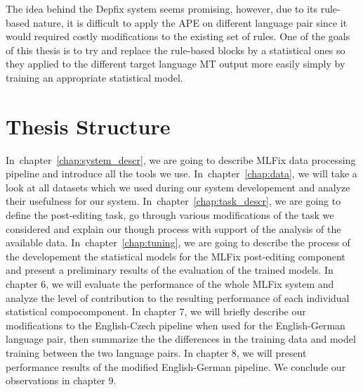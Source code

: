 The idea behind the Depfix system seems promising, however, due to its rule-based nature, it is difficult
to apply the APE on different language pair since it would required costly modifications to the
existing set of rules. One of the goals of this thesis is to try and replace the rule-based blocks
by a statistical ones so they applied to the different target language MT output more easily simply
by training an appropriate statistical model.

\section{Thesis Structure}

In~chapter~\ref{chap:system_descr}, we are going to describe MLFix data processing
pipeline and introduce all the tools we use.
In~chapter~\ref{chap:data}, we will take a look at all datasets which we used during our system
developement and analyze their usefulness for our system.
In~chapter~\ref{chap:task_descr}, we are going to define the post-editing task, go through
various modifications of the task we considered and explain our though
process with support of the analysis of the available data.
In~chapter~\ref{chap:tuning}, we are going to describe the process of the developement
the statistical models for the MLFix post-editing component and present
a preliminary results of the evaluation of the trained models.
In chapter 6, we will evaluate the performance of the whole MLFix system
and analyze the level of contribution to the resulting performance
of each individual statistical compocomponent.
In chapter 7, we will briefly describe our modifications to the English-Czech pipeline
when used for the English-German language pair, then summarize the the differences
in the training data and model training between the two language pairs.
In chapter 8, we will present performance results of the modified English-German
pipeline.
We conclude our observations in chapter 9.

